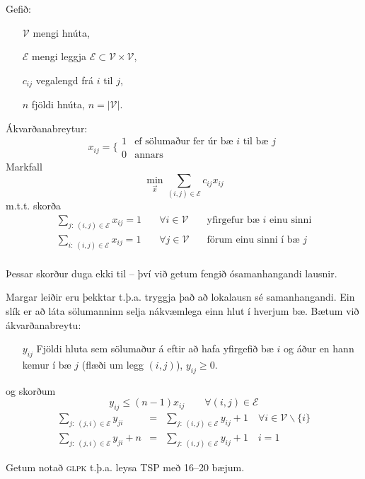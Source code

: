 \begin{samepage}
\begin{lausn}
Gefið:
\begin{enumerate}
  \item[$\mathcal{V}$] mengi hnúta,
  \item[$\mathcal{E}$] mengi leggja $\mathcal{E}\subset \mathcal{V}\times\mathcal{V}$,
  \item[$c_{ij}$] vegalengd frá $i$ til $j$,
  \item[$n$] fjöldi hnúta, $n=|\mathcal{V}|$.
\end{enumerate}
Ákvarðanabreytur:
\[ x_{ij}=\Bigg\{\begin{array}{cl}1 & \textrm{ef sölumaður fer úr bæ $i$ til bæ $j$} \\ 0 & \textrm{annars}\end{array}\]
Markfall 
\[ \min_{\vec{x}} \sum_{(i,j)\in\mathcal{E}}c_{ij}x_{ij}\]
m.t.t. skorða
\begin{eqnarray*}
  \sum_{j:\;(i,j)\in\mathcal{E}}x_{ij}=1 &\quad \forall i\in\mathcal{V}\quad & \mbox{yfirgefur bæ $i$ einu sinni}\\
  \sum_{i:\;(i,j)\in\mathcal{E}}x_{ij}=1 &\quad \forall j\in\mathcal{V}\quad & \mbox{förum einu sinni í bæ }j\\
\end{eqnarray*}

  \begin{aths}
    Þessar skorður duga ekki til -- því við getum fengið ósamanhangandi lausnir.
  \end{aths}

Margar leiðir eru þekktar t.þ.a. tryggja það að lokalausn sé samanhangandi. Ein slík er að láta sölumanninn selja nákvæmlega einn hlut í hverjum bæ. Bætum við ákvarðanabreytu:
\begin{enumerate}
  \item[$y_{ij}$] Fjöldi hluta sem sölumaður á eftir að hafa yfirgefið bæ $i$ og áður en hann kemur í bæ $j$ (flæði um legg $(i,j)$), $y_{ij}\geq0$. 
\end{enumerate}
og skorðum
\[y_{ij} \leq (n-1)x_{ij} \quad\quad\forall(i,j)\in\mathcal{E} \]
\begin{eqnarray*}
  \sum_{j:\;(j,i)\in\mathcal{E}}y_{ji}&=&\sum_{j:\;(i,j)\in\mathcal{E}}y_{ij}+1\quad\forall i\in\mathcal{V}\backslash\{i\} \\
  \sum_{j:\;(j,i)\in\mathcal{E}}y_{ji}+n&=&\sum_{j:\;(i,j)\in\mathcal{E}}y_{ij}+1\quad i=1 
\end{eqnarray*}
\begin{aths}Getum notað \textsc{glpk} t.þ.a. leysa TSP með 16--20 bæjum.\end{aths}
\end{lausn}
\end{samepage}

